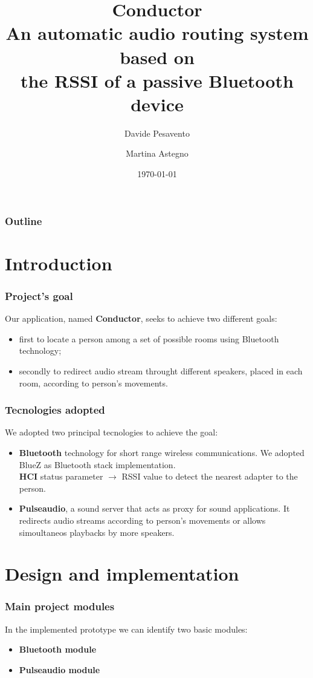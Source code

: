 \documentclass{beamer}
\title{\textbf{Conductor} \\
	An automatic audio routing system based on \\
	the RSSI of a passive Bluetooth device}
\author{Davide Pesavento \and Martina Astegno}
\institute{Università degli Studi di Padova \\
	Corso di Laurea Magistrale in Informatica}
\date{\today}
\begin{document}
\begin{frame}[plain]
\titlepage
\end{frame}

\begin{frame}[plain]
\frametitle{Outline}
\tableofcontents
\end{frame}


\section{Introduction}

\begin{frame}
\frametitle{Project's goal}
Our application, named \textbf{Conductor}, seeks to achieve two different goals:
\pause
\begin{itemize}
	\item first to locate a person among a set of possible rooms using Bluetooth technology;
	\pause
	\item secondly to redirect audio stream throught different speakers, placed in each room, according to person's movements.
\end{itemize}
\end{frame}

\begin{frame}
\frametitle{Tecnologies adopted}
We adopted two principal tecnologies to achieve the goal:
\pause
\begin{itemize}
	\item \textbf{Bluetooth} technology for short range wireless communications. We adopted BlueZ as Bluetooth stack implementation.\\ \textbf{HCI} status parameter $\rightarrow$ RSSI value to detect the nearest adapter to the person.
	\pause
	\item \textbf{Pulseaudio}, a sound server that acts as proxy for sound applications. It redirects audio streams according to person's movements or allows simoultaneos playbacks by more speakers.
\end{itemize}
\end{frame}


\section{Design and implementation}

\begin{frame}
\frametitle{Main project modules}
In the implemented prototype we can identify two basic modules:
\begin{itemize}
	\item \textbf{Bluetooth module}
	\item \textbf{Pulseaudio module}
	\end{itemize}
\end{frame}
\end{document}
